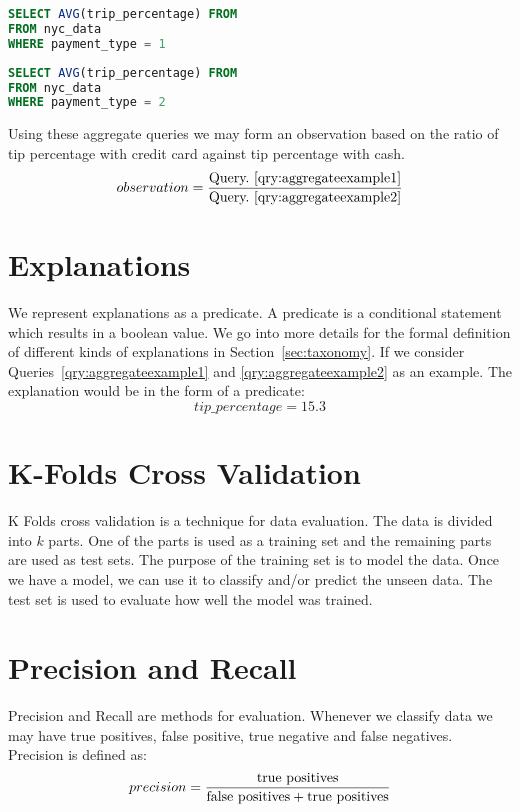 \renewcommand{\lstlistingname}{Query}%
\begin{lstlisting}[language=SQL, caption=Aggregate Query for average tip percentage with credit cards, label=qry:aggregateexample1]
SELECT AVG(trip_percentage) FROM
FROM nyc_data
WHERE payment_type = 1
\end{lstlisting}

\renewcommand{\lstlistingname}{Query}%
\begin{lstlisting}[language=SQL, caption=Aggregate Query for average tip percentage with cash, label=qry:aggregateexample2]
SELECT AVG(trip_percentage) FROM
FROM nyc_data
WHERE payment_type = 2
\end{lstlisting}

Using these aggregate queries we may form an observation based on the ratio of tip percentage with credit card against tip percentage with cash. 
$$observation = \frac{\textnormal{Query.~\ref{qry:aggregateexample1}}}{\textnormal{Query.~\ref{qry:aggregateexample2}}}$$


\section{Explanations}
We represent explanations as a predicate. A predicate is a conditional statement which results in a boolean value. We go into more details for the formal definition of different kinds of explanations in Section~\ref{sec:taxonomy}. If we consider Queries~\ref{qry:aggregateexample1} and \ref{qry:aggregateexample2} as an example. The explanation would be in the form of a predicate: 
$$tip\_percentage = 15.3$$


\section{K-Folds Cross Validation}
K Folds cross validation is a technique for data evaluation\citep{kohavi1995study,refaeilzadeh2009cross}. The data is divided into $k$ parts. One of the parts is used as a training set and the remaining parts are used as test sets. The purpose of the training set is to model the data. Once we have a model, we can use it to classify and/or predict the unseen data. The test set is used to evaluate how well the model was trained.

\section{Precision and Recall}
Precision and Recall are methods for evaluation\citep{olson2008advanced,powers2011evaluation}. Whenever we classify data we may have true positives, false positive, true negative and false negatives. Precision is defined as: 
$$precision = \frac{\textnormal{true positives}}{\textnormal{false positives} + \textnormal{true positives}}$$


